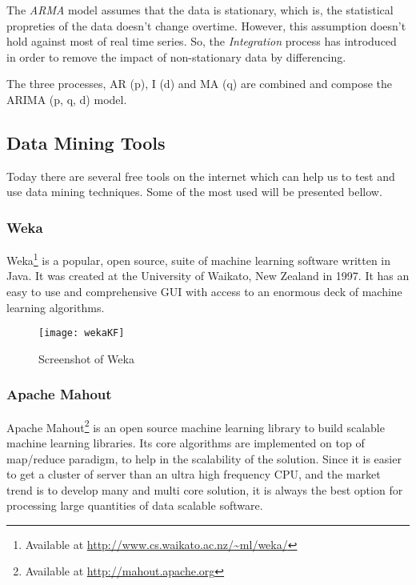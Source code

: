The \emph{ARMA} model assumes that the data is stationary, which is, the
statistical propreties of the data doesn't change overtime. However, this
assumption doesn't hold against most of real time series.\cite{box2013time} So,
the \emph{Integration} process has introduced in order to remove the impact of
non-stationary data by differencing.

The three processes, AR (p), I (d) and MA (q) are combined and compose the ARIMA
(p, q, d) model.

\subsection{Data Mining Tools} Today there are several free tools on the
internet which can help us to test and use data mining techniques. Some of the
most used will be presented bellow.

\subsubsection{Weka}

Weka\footnote{ Available at \url{http://www.cs.waikato.ac.nz/~ml/weka/}} is a
popular, open source, suite of machine learning software written in Java. It was
created at the University of Waikato, New Zealand in 1997. It has an easy to use
and comprehensive GUI with access to an enormous deck of machine learning
algorithms.

\begin{figure}[h] \begin{center} \leavevmode
\texttt{[image: wekaKF]} \caption{Screenshot of Weka
\protect\footnotemark} \label{fig:RapidMiner} \end{center} \end{figure}

\subsubsection{Apache Mahout}

Apache Mahout\footnote{ Available at \url{http://mahout.apache.org}} is an open
source machine learning library to build scalable machine learning libraries.
Its core algorithms are implemented on top of map/reduce paradigm, to help in
the scalability of the solution. Since it is easier to get a cluster of server
than an ultra high frequency CPU, and the market trend is to develop many and
multi core solution, it is always the best option for processing large
quantities of data scalable software.


